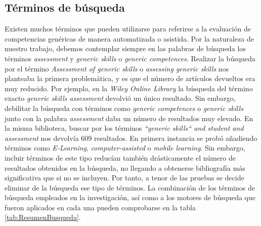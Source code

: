 \subsection{Términos de búsqueda}
\label{sec:TerminosBusqueda}
Existen muchos términos que pueden utilizarse para referirse a la evaluación de competencias genéricas de manera automatizada o asistida. Por la naturaleza de nuestro trabajo, debemos contemplar siempre en las palabras de búsqueda los términos \emph{assessment} y \emph{generic skills} o \emph{generic competences}. Realizar la búsqueda por el término \emph{Assessment of generic skills} o \emph{assessing generic skills} nos planteaba la primera problemática, y es que el número de artículos devueltos era muy reducido. Por ejemplo, en la \emph{Wiley Online Library} la búsqueda del término exacto \emph{generic skills assessment} devolvió un único resultado. Sin embargo, debilitar la búsqueda con términos como \emph{generic competences} o \emph{generic skills} junto con la palabra \emph{assessment} daba un número de resultados muy elevado. En la misma biblioteca, buscar por los términos \emph{``generic skills`` and student and assessment} nos devolvía 609 resultados. En primera instancia se probó añadiendo términos como  \emph{E-Learning}, \emph{computer-assisted} o \emph{mobile learning}. Sin embargo, incluir términos de este tipo reducían también drásticamente el número de resultados obtenidos en la búsqueda, no llegando a obtenerse bibliografía más significativa que si no se incluyen. Por tanto, a tenor de las pruebas se decide eliminar de la búsqueda ese tipo de términos. La combinación de los términos de búsqueda empleados en la investigación, así como a los motores de búsqueda que fueron aplicados en cada una pueden comprobarse en la tabla \ref{tab:ResumenBusqueda}.


